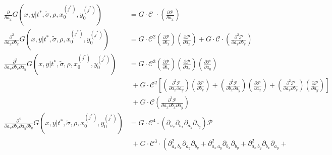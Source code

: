 \begin{align}
  \frac{\partial}{\partial a_x} G(x,y|t^{*}, \tilde{\sigma}, \rho, x_0^{(j^*)}, y_0^{(j^*)}) &= G \cdot \mathcal{C}\,\,\cdot \left( \frac{\partial \mathcal{P}}{\partial a_x} \right)\\
  \frac{\partial^2}{\partial a_x \partial b_x} G(x,y|t^{*}, \tilde{\sigma}, \rho, x_0^{(j^*)}, y_0^{(j^*)}) &= G \cdot \mathcal{C}^2 \left( \frac{\partial \mathcal{P}}{\partial b_x} \right) \left( \frac{\partial \mathcal{P}}{\partial a_x} \right) + G \cdot \mathcal{C} \cdot \left( \frac{\partial^2 \mathcal{P}}{\partial a_x \partial b_x} \right) \\
  \frac{\partial^3}{\partial a_x \partial b_x \partial a_y} G(x,y|t^{*}, \tilde{\sigma}, \rho, x_0^{(j^*)}, y_0^{(j^*)}) &= G \cdot \mathcal{C}^3 \left( \frac{\partial \mathcal{P}}{\partial b_x} \right) \left( \frac{\partial \mathcal{P}}{\partial a_x} \right) \left( \frac{\partial \mathcal{P}}{\partial a_y} \right) \nonumber \\
                                                                                             &\,\, + G \cdot \mathcal{C}^2 \left[\left( \frac{\partial^2 \mathcal{P}}{\partial a_x \partial a_y} \right) \left( \frac{\partial \mathcal{P}}{\partial b_x} \right) + \left( \frac{\partial^2 \mathcal{P}}{\partial b_x \partial a_y} \right) \left( \frac{\partial \mathcal{P}}{\partial a_x} \right) + \left( \frac{\partial^2 \mathcal{P}}{\partial a_x \partial b_x} \right) \left( \frac{\partial \mathcal{P}}{\partial a_y} \right)\right] \nonumber \\
                                                                                             &\,\, + G \cdot \mathcal{C} \left( \frac{\partial^3 \mathcal{P}}{\partial a_x \partial b_x \partial a_y} \right) \nonumber \\
  \frac{\partial^4}{\partial a_x \partial b_x \partial a_y \partial b_y} G(x,y|t^{*}, \tilde{\sigma}, \rho, x_0^{(j^*)}, y_0^{(j^*)}) &= G \cdot \mathcal{C}^4 \cdot \left(\partial_{a_x}\partial_{b_x} \partial_{a_y}\partial_{b_y} \right)\mathcal{P} \nonumber \\
                                                                                             &\,\, + G \cdot \mathcal{C}^3 \cdot \left( \partial^2_{a_x\, b_x} \partial_{a_y} \partial_{b_y} + \partial^2_{a_x\, a_y} \partial_{b_x} \partial_{b_y} + \partial^2_{a_x\, b_y} \partial_{b_x} \partial_{a_y} + \right. \nonumber \\

\end{align}
